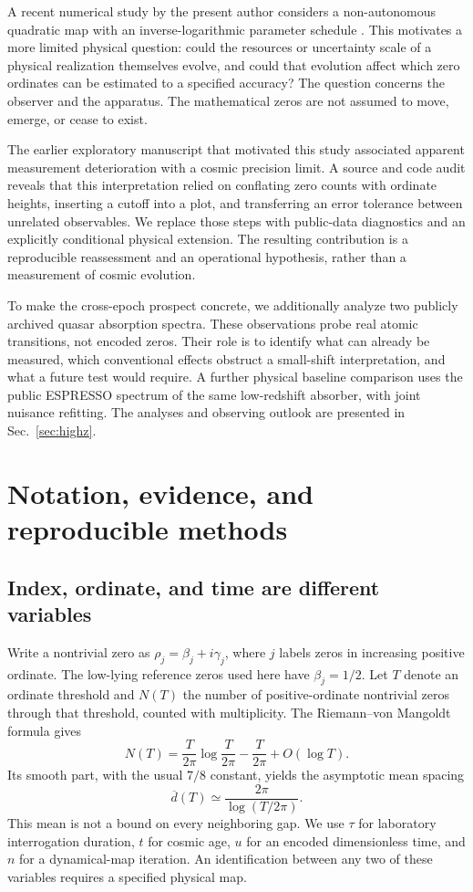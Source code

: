 \documentclass[aps,pra,onecolumn,amsmath,amssymb,nofootinbib,superscriptaddress,floatfix,11pt]{revtex4-2}
\begin{document}
A recent numerical study by the present author considers a non-autonomous quadratic map with an inverse-logarithmic parameter schedule \cite{Wang2026Spectral}. This motivates a more limited physical question: could the resources or uncertainty scale of a physical realization themselves evolve, and could that evolution affect which zero ordinates can be estimated to a specified accuracy? The question concerns the observer and the apparatus. The mathematical zeros are not assumed to move, emerge, or cease to exist.

The earlier exploratory manuscript that motivated this study associated apparent measurement deterioration with a cosmic precision limit. A source and code audit reveals that this interpretation relied on conflating zero counts with ordinate heights, inserting a cutoff into a plot, and transferring an error tolerance between unrelated observables. We replace those steps with public-data diagnostics and an explicitly conditional physical extension. The resulting contribution is a reproducible reassessment and an operational hypothesis, rather than a measurement of cosmic evolution.

To make the cross-epoch prospect concrete, we additionally analyze two publicly archived quasar absorption spectra. These observations probe real atomic transitions, not encoded zeros. Their role is to identify what can already be measured, which conventional effects obstruct a small-shift interpretation, and what a future test would require. A further physical baseline comparison uses the public ESPRESSO spectrum of the same low-redshift absorber, with joint nuisance refitting. The analyses and observing outlook are presented in Sec.~\ref{sec:highz}.

\section{Notation, evidence, and reproducible methods}
\subsection{Index, ordinate, and time are different variables}
Write a nontrivial zero as $\rho_j=\beta_j+i\gamma_j$, where $j$ labels zeros in increasing positive ordinate. The low-lying reference zeros used here have $\beta_j=1/2$. Let $T$ denote an ordinate threshold and $N(T)$ the number of positive-ordinate nontrivial zeros through that threshold, counted with multiplicity. The Riemann--von Mangoldt formula gives \cite{Titchmarsh1986}
\begin{equation}
 N(T)=\frac{T}{2\pi}\log\frac{T}{2\pi}-\frac{T}{2\pi}+O(\log T).
 \label{eq:count}
\end{equation}
Its smooth part, with the usual $7/8$ constant, yields the asymptotic mean spacing
\begin{equation}
 \overline d(T)\simeq\frac{2\pi}{\log(T/2\pi)}.
 \label{eq:spacing}
\end{equation}
This mean is not a bound on every neighboring gap. We use $\tau$ for laboratory interrogation duration, $t$ for cosmic age, $u$ for an encoded dimensionless time, and $n$ for a dynamical-map iteration. An identification between any two of these variables requires a specified physical map.
\end{document}
